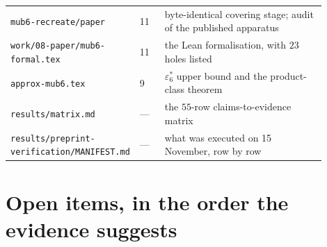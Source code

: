 \documentclass[10pt]{article}
\theoremstyle{definition}
\newcommand{\file}[1]{\texttt{\small #1}}
\begin{document}
\begin{center}
\begin{longtable}{@{}L{0.30\linewidth}L{0.08\linewidth}L{0.52\linewidth}@{}}
\file{mub6-\allowbreak{}recreate/\allowbreak{}paper} & 11 & byte-identical covering stage; audit of the published apparatus \\
\file{work/\allowbreak{}08-\allowbreak{}paper/\allowbreak{}mub6-\allowbreak{}formal.tex} & 11 & the Lean formalisation, with $23$ holes listed \\
\file{approx-\allowbreak{}mub6.tex} & 9 & $\varepsilon_6^*$ upper bound and the product-class theorem \\
\file{results/\allowbreak{}matrix.md} & --- & the $55$-row claims-to-evidence matrix \\
\file{results/\allowbreak{}preprint-\allowbreak{}verification/\allowbreak{}MANIFEST.md} & --- & what was executed on 15 November, row by row \\
\bottomrule
\end{longtable}
\end{center}

\section{Open items, in the order the evidence suggests}\label{sec:open}
\end{document}
